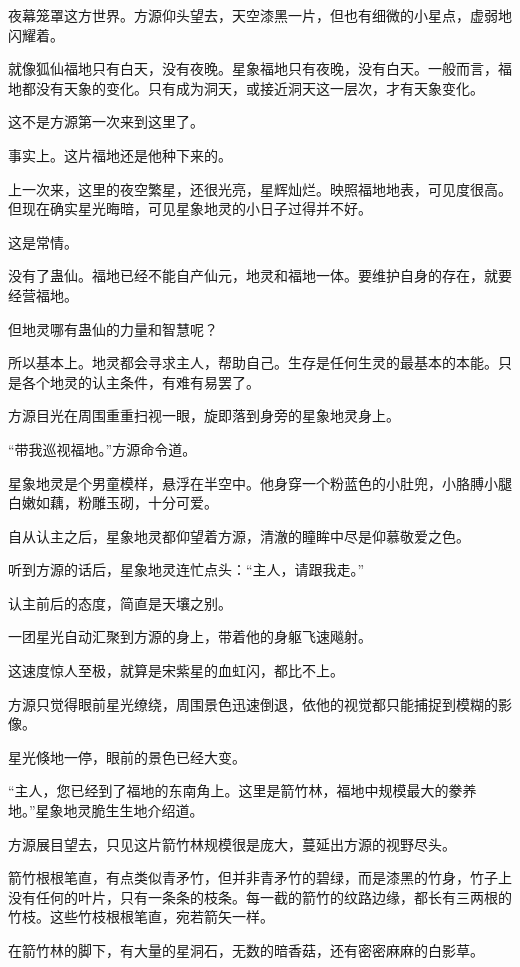 \begin{this_body}
夜幕笼罩这方世界。方源仰头望去，天空漆黑一片，但也有细微的小星点，虚弱地闪耀着。

就像狐仙福地只有白天，没有夜晚。星象福地只有夜晚，没有白天。一般而言，福地都没有天象的变化。只有成为洞天，或接近洞天这一层次，才有天象变化。

这不是方源第一次来到这里了。

事实上。这片福地还是他种下来的。

上一次来，这里的夜空繁星，还很光亮，星辉灿烂。映照福地地表，可见度很高。但现在确实星光晦暗，可见星象地灵的小日子过得并不好。

这是常情。

没有了蛊仙。福地已经不能自产仙元，地灵和福地一体。要维护自身的存在，就要经营福地。

但地灵哪有蛊仙的力量和智慧呢？

所以基本上。地灵都会寻求主人，帮助自己。生存是任何生灵的最基本的本能。只是各个地灵的认主条件，有难有易罢了。

方源目光在周围重重扫视一眼，旋即落到身旁的星象地灵身上。

“带我巡视福地。”方源命令道。

星象地灵是个男童模样，悬浮在半空中。他身穿一个粉蓝色的小肚兜，小胳膊小腿白嫩如藕，粉雕玉砌，十分可爱。

自从认主之后，星象地灵都仰望着方源，清澈的瞳眸中尽是仰慕敬爱之色。

听到方源的话后，星象地灵连忙点头：“主人，请跟我走。”

认主前后的态度，简直是天壤之别。

一团星光自动汇聚到方源的身上，带着他的身躯飞速飚射。

这速度惊人至极，就算是宋紫星的血虹闪，都比不上。

方源只觉得眼前星光缭绕，周围景色迅速倒退，依他的视觉都只能捕捉到模糊的影像。

星光倏地一停，眼前的景色已经大变。

“主人，您已经到了福地的东南角上。这里是箭竹林，福地中规模最大的豢养地。”星象地灵脆生生地介绍道。

方源展目望去，只见这片箭竹林规模很是庞大，蔓延出方源的视野尽头。

箭竹根根笔直，有点类似青矛竹，但并非青矛竹的碧绿，而是漆黑的竹身，竹子上没有任何的叶片，只有一条条的枝条。每一截的箭竹的纹路边缘，都长有三两根的竹枝。这些竹枝根根笔直，宛若箭矢一样。

在箭竹林的脚下，有大量的星洞石，无数的暗香菇，还有密密麻麻的白影草。


\end{this_body}
